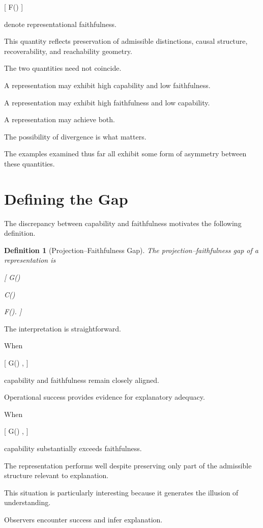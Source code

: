 \documentclass[11pt,oneside,openany]{book}
\newtheorem{definition}{Definition}[chapter] \newtheorem{theorem}{Theorem}[chapter] \newtheorem{proposition}{Proposition}[chapter] \newtheorem{lemma}{Lemma}[chapter] \newtheorem{corollary}{Corollary}[chapter] \newtheorem{remark}{Remark}[chapter]
\begin{document}
[
F(\pi)
]

denote representational faithfulness.

This quantity reflects preservation of admissible distinctions, causal structure, recoverability, and reachability geometry.

The two quantities need not coincide.

A representation may exhibit high capability and low faithfulness.

A representation may exhibit high faithfulness and low capability.

A representation may achieve both.

The possibility of divergence is what matters.

The examples examined thus far all exhibit some form of asymmetry between these quantities.

\section{Defining the Gap}

The discrepancy between capability and faithfulness motivates the following definition.

\begin{definition}[Projection--Faithfulness Gap]

The projection--faithfulness gap of a representation is

[
G(\pi)

C(\pi)

F(\pi).
]

\end{definition}

The interpretation is straightforward.

When

[
G(\pi)
,
]

capability and faithfulness remain closely aligned.

Operational success provides evidence for explanatory adequacy.

When

[
G(\pi)
,
]

capability substantially exceeds faithfulness.

The representation performs well despite preserving only part of the admissible structure relevant to explanation.

This situation is particularly interesting because it generates the illusion of understanding.

Observers encounter success and infer explanation.
\end{document}

